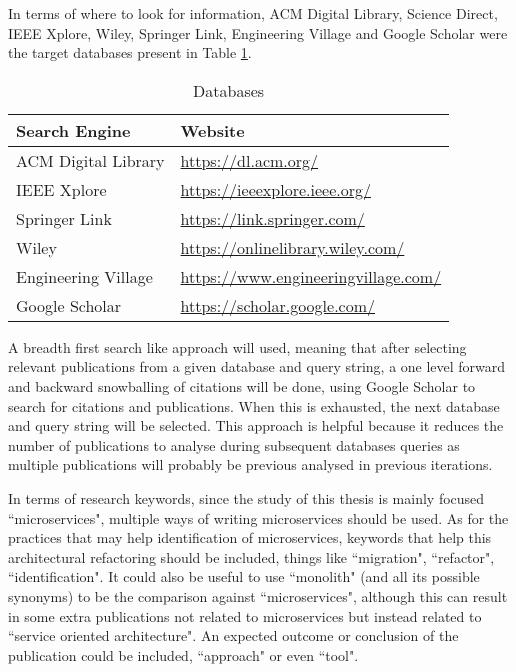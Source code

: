 \documentclass{article}
\begin{document}
In terms of where to look for information, ACM Digital Library, Science Direct,
IEEE Xplore, Wiley, Springer Link, Engineering Village and Google Scholar were
the target databases present in Table \ref{tab:databases}.

\begin{table}[H]
  \caption{Databases}
  \label{tab:databases}
  \begin{center}
    \begin{tabular}[c]{l|l}
      \textbf{Search Engine} &
      \textbf{Website} \\
      \hline
      ACM Digital Library &
      \url{https://dl.acm.org/} \\
      \hline
      IEEE Xplore &
      \url{https://ieeexplore.ieee.org/} \\
      \hline
      Springer Link &
      \url{https://link.springer.com/} \\
      \hline
      Wiley &
      \url{https://onlinelibrary.wiley.com/} \\
      \hline
      Engineering Village &
      \url{https://www.engineeringvillage.com/} \\
      \hline
      Google Scholar &
      \url{https://scholar.google.com/} \\
    \end{tabular}
  \end{center}
\end{table}



A breadth first search like approach will used, meaning that after selecting
relevant publications from a given database and query string, a one level
forward and backward snowballing of citations will be done, using Google
Scholar to search for citations and publications. When this is exhausted, the
next database and query string will be selected. This approach is helpful
because it reduces the number of publications to analyse during subsequent
databases queries as multiple publications will probably be previous analysed
in previous iterations.

In terms of research keywords, since the study of this thesis is mainly focused
``microservices", multiple ways of writing microservices should be used. As for
the practices that may help identification of microservices, keywords that help
this architectural refactoring should be included, things like ``migration",
``refactor", ``identification". It could also be useful to use ``monolith" (and
all its possible synonyms) to be the comparison against ``microservices",
although this can result in some extra publications not related to
microservices but instead related to ``service oriented architecture". An
expected outcome or conclusion of the publication could be included,
``approach" or even ``tool".
\end{document}
